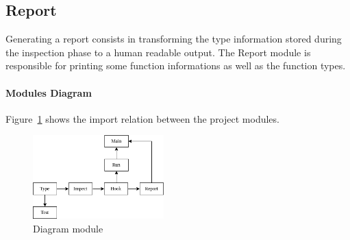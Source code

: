 \subsection*{Report}
Generating a report consists in transforming the type information stored during the inspection phase to a human readable output. The Report module is responsible for printing some function informations as well as the function types.

\paragraph*{Modules Diagram}
Figure~\ref{fig:diag} shows the import relation between the project modules.
\begin{figure}
\centering
\includegraphics[width=0.45\textwidth]{pictures/module_diagram.png}
\caption{Diagram module}
\label{fig:diag}
\end{figure}










